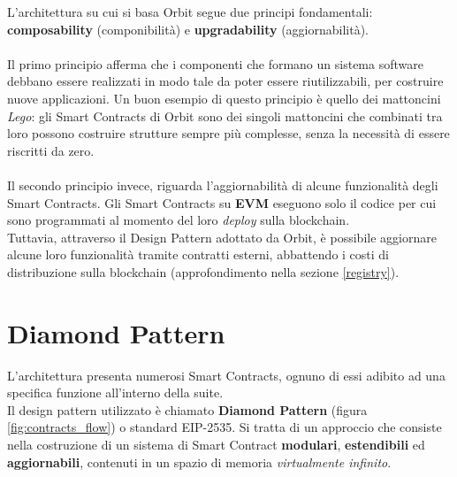 \documentclass[12pt,a4paper]{report}
\begin{document}
L'architettura su cui si basa Orbit segue due principi fondamentali: \textbf{composability} (componibilità) e \textbf{upgradability} (aggiornabilità).
\\\\Il primo principio afferma che i componenti che formano un sistema software debbano essere realizzati in modo tale da poter essere riutilizzabili, per costruire nuove applicazioni. Un buon esempio di questo principio è quello dei mattoncini \textit{Lego}: gli Smart Contracts di Orbit sono dei singoli mattoncini che combinati tra loro possono costruire strutture sempre più complesse, senza la necessità di essere riscritti da zero.
\\\\Il secondo principio invece, riguarda l'aggiornabilità di alcune funzionalità degli Smart Contracts. Gli Smart Contracts su \textbf{EVM}\cite{evm} eseguono solo il codice per cui sono programmati al momento del loro \textit{deploy} sulla blockchain. \\Tuttavia, attraverso il Design Pattern adottato da Orbit, è possibile aggiornare alcune loro funzionalità tramite contratti esterni, abbattendo i costi di distribuzione sulla blockchain (approfondimento nella sezione \ref{registry}).

\section{Diamond Pattern}

L'architettura presenta numerosi Smart Contracts, ognuno di essi adibito ad una specifica funzione all'interno della suite.
\\Il design pattern utilizzato è chiamato \textbf{Diamond Pattern}\cite{diamond} (figura \ref{fig:contracts_flow}) o standard EIP-2535. Si tratta di un approccio che consiste nella costruzione di un sistema di Smart Contract \textbf{modulari}, \textbf{estendibili} ed \textbf{aggiornabili}, contenuti in  un spazio di memoria \textit{virtualmente infinito}.
\end{document}
